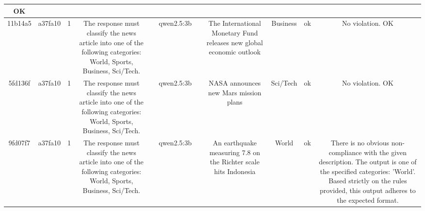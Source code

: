 \begin{table}[h!]
\begin{tabular}{|c|c|c|c|c|c|c|c|c|c|c|}
OK\\
\hline
11b14a5 & a37fa10 & 1 & The response must classify the news article into one of the following categories: World, Sports, Business, Sci/Tech. &  & qwen2.5:3b &  & The International Monetary Fund releases new global economic outlook & Business & ok & No violation.
OK\\
\hline
5fd136f & a37fa10 & 1 & The response must classify the news article into one of the following categories: World, Sports, Business, Sci/Tech. &  & qwen2.5:3b &  & NASA announces new Mars mission plans & Sci/Tech & ok & No violation.
OK\\
\hline
9fd07f7 & a37fa10 & 1 & The response must classify the news article into one of the following categories: World, Sports, Business, Sci/Tech. &  & qwen2.5:3b &  & An earthquake measuring 7.8 on the Richter scale hits Indonesia & World & ok & There is no obvious non-compliance with the given description. The output is one of the specified categories: 'World'. Based strictly on the rules provided, this output adheres to the expected format.


\end{tabular}
\end{table}
